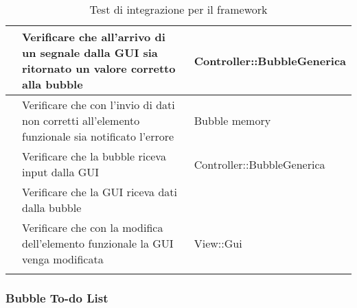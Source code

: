 \begin{longtable}{|c|P{7cm}|P{5cm}|}
	\hline {} & Verificare che all'arrivo di un segnale dalla GUI sia ritornato un valore corretto alla bubble & Controller::BubbleGenerica \\
	\hline {} & Verificare che con l'invio di dati non corretti all'elemento funzionale sia notificato l'errore & Bubble memory \\
	\hline {} & Verificare che la bubble riceva input dalla GUI & Controller::BubbleGenerica \\
	\hline {} & Verificare che la GUI riceva dati dalla bubble & \\
	\hline {} & Verificare che con la modifica dell'elemento funzionale la GUI venga modificata & View::Gui \\
	\hline
	\caption{Test di integrazione per il framework}
\end{longtable}

\subsubsection{Bubble To-do List}

